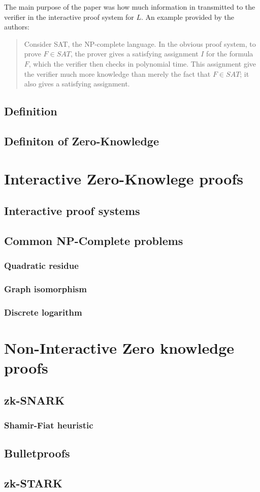 \documentclass[12pt,a4paper]{article}
\begin{document}
The main purpose of the paper was how much information in transmitted to the verifier in the interactive proof system for $L$.
An example provided by the authors:
\begin{quotation}
Consider SAT, the NP-complete language. In the obvious proof system, to prove $F \in SAT$, the prover gives a satisfying assignment $I$ for the formula $F$, which the verifier then checks in polynomial time. This assignment give the verifier much more knowledge than merely the fact that $F \in SAT$; it also gives a satisfying assignment.
\end{quotation}

\subsection{Definition}
\subsection{Definiton of Zero-Knowledge}
\section{Interactive Zero-Knowlege proofs}
\subsection{Interactive proof systems}
\subsection{Common NP-Complete problems}
\subsubsection{Quadratic residue}
\subsubsection{Graph isomorphism}
\subsubsection{Discrete logarithm}
\section{Non-Interactive Zero knowledge proofs}
\subsection{zk-SNARK} 
\subsubsection{Shamir-Fiat heuristic}
\subsection{Bulletproofs}
\subsection{zk-STARK}

\printbibliography
\end{document}
